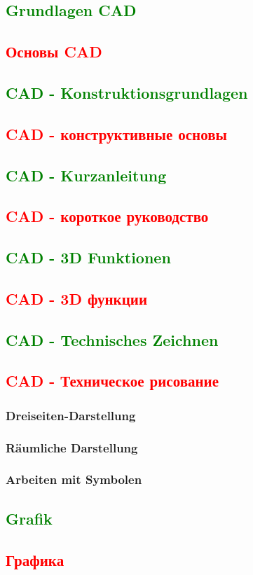 \documentclass[14pt,a4paper]{book}
\newcommand{\DE}[1]{\textcolor{green}{#1}}
\newcommand{\RU}[1]{\textcolor{red}{#1}}
\begin{document}
\DE{\chapter{Grundlagen CAD}}
\RU{\chapter{Основы CAD}}
	\DE{\section{CAD - Konstruktionsgrundlagen}}
	\RU{\section{CAD - конструктивные основы}}
	\DE{\section{CAD - Kurzanleitung}}
	\RU{\section{CAD - короткое руководство}}
	\DE{\section{CAD - 3D Funktionen}}
	\RU{\section{CAD - 3D функции}}
	\DE{\section{CAD - Technisches Zeichnen}}
	\RU{\section{CAD - Техническое рисование}}
		\subsection{Dreiseiten-Darstellung}
		\subsection{Räumliche Darstellung}
		\subsection{Arbeiten mit Symbolen}
	\DE{\section{Grafik}}
	\RU{\section{Графика}}
\end{document}
